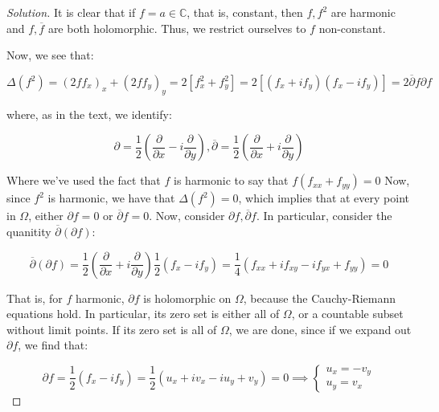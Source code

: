 \documentclass[10pt]{article}
\begin{document}
\begin{proof}[Solution]

It is clear that if $f = a \in\mathbb{C}$, that is, constant, then $f, f^2$ are harmonic and $f, \overline{f}$ are both holomorphic. Thus, we restrict ourselves to $f$ non-constant.

Now, we see that:

$$ \Delta (f^2) = (2ff_x)_x + (2ff_y)_y = 2[ f_x^2 + f_y^2] = 2[ (f_x + i f_y)(f_x - i f_y)] = 2\overline{\partial} f \partial f$$

where, as in the text, we identify:

$$  \partial = \frac{1}{2} \left( \frac{\partial}{\partial x}- i  \frac{\partial}{\partial y}\right) , \overline{\partial} = \frac{1}{2} \left( \frac{\partial}{\partial x}+ i  \frac{\partial}{\partial y}\right)$$

Where we've used the fact that $f$ is harmonic to say that $f(f_{xx} + f_{yy}) = 0$ Now, since $f^2$ is harmonic, we have that $\Delta(f^2) = 0$, which implies that at every point in $\Omega$, either $\partial f = 0$ or $\overline{\partial} f = 0$. Now, consider $\partial f, \overline{\partial}f$. In particular, consider the quanitity $\overline{\partial}( \partial f)$:






$$ \overline{\partial} (\partial f) = \frac{1}{2} \left( \frac{\partial}{\partial x}+ i  \frac{\partial}{\partial y}\right)  \frac{1}{2} (f_x- i f_y) = \frac{1}{4} (f_{xx} + i f_{xy} - i f_{yx} + f_{yy}) = 0 $$

That is, for $f$ harmonic, $\partial f$ is holomorphic on $\Omega$, because the Cauchy-Riemann equations hold. In particular, its zero set is either all of $\Omega$, or a countable subset without limit points. If its zero set is all of $\Omega$, we are done, since if we expand out $\partial f$, we find that:

$$ \partial f = \frac{1}{2} (f_x - i f_y) = \frac{1}{2} (u_x + i v_x - i u_y + v_y) = 0 \implies \begin{cases} u_x  = - v_y \\ u_y = v_x \end{cases}$$


\end{proof}
\end{document}
